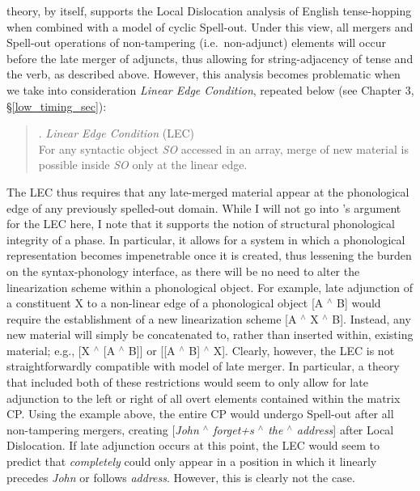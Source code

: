  theory, by itself, supports the Local Dislocation analysis of English tense-hopping when combined with a model of cyclic Spell-out. Under this view, all mergers and Spell-out operations of non-tampering (i.e.\ non-adjunct) elements will occur before the late merger of adjuncts, thus allowing for string-adjacency of tense and the verb, as described above. However, this analysis becomes problematic when we take into consideration  {\it Linear Edge Condition}, repeated below (see Chapter 3, \S\ref{low_timing_sec}):

\singlespacing
\begin{quote}
\ex. {\it Linear Edge Condition} (LEC) \citep{nissenbaum2000}\\
For any syntactic object {\it SO} accessed in an array, merge of new material is possible inside {\it SO} only at the linear edge.

\end{quote}
\onehalfspacing
The LEC thus requires that any late-merged material appear at the phonological edge of any previously spelled-out domain. While I will not go into \citeauthor{nissenbaum2000}'s argument for the LEC here, I note that it supports the notion of structural phonological integrity of a phase. In particular, it allows for a system in which a phonological representation becomes impenetrable once it is created, thus lessening the burden on the syntax-phonology interface, as there will be no need to alter the linearization scheme within a phonological object. For example, late adjunction of a constituent X to a non-linear edge of a phonological object [A $^{\wedge}$ B] would require the establishment of a new linearization scheme [A $^{\wedge}$ X $^{\wedge}$ B]. Instead, any new material will simply be concatenated to, rather than inserted within, existing material; e.g., [X $^{\wedge}$ [A $^{\wedge}$ B]] or [[A $^{\wedge}$ B] $^{\wedge}$ X]. Clearly, however, the LEC is not straightforwardly compatible with  model of late merger. In particular, a theory that included both of these restrictions would seem to only allow for late adjunction to the left or right of all overt elements contained within the matrix CP. Using the example above, the entire CP would undergo Spell-out after all non-tampering mergers, creating [\textit{John $^{\wedge}$ forget+s $^{\wedge}$ the $^{\wedge}$ address}] after Local Dislocation. If late adjunction occurs at this point, the LEC would seem to predict that {\it completely} could only appear in a position in which it linearly precedes {\it John} or follows {\it address}. However, this is clearly not the case.

